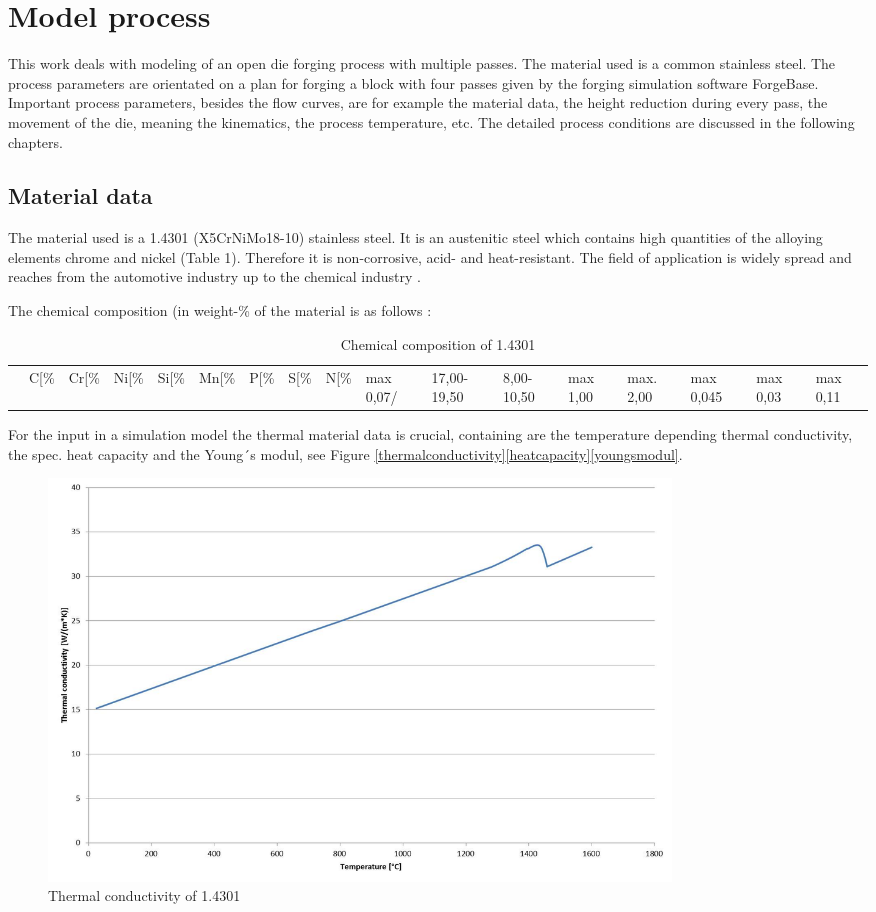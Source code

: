 \section{Model process}
This work deals with modeling of an open die forging process with multiple passes. The material used is a common stainless steel. The process parameters are orientated on a plan for forging a block with four passes given by the forging simulation software ForgeBase. Important process parameters, besides the flow curves, are for example the material data, the height reduction during every pass, the movement of the die, meaning the kinematics, the process temperature, etc. The detailed process conditions are discussed in the following chapters.\par

\subsection{Material data}
The material used is a 1.4301 (X5CrNiMo18-10) stainless steel. It is an austenitic steel which contains high quantities of the alloying elements chrome and nickel (Table 1). Therefore it is non-corrosive, acid- and heat-resistant. The field of application is widely spread and reaches from the automotive industry up to the chemical industry \cite{1.4301}.\par

The chemical composition (in weight-\%\) of the material is as follows \cite{metallograf.de}:\begin{table}
 \centering
 \caption{Chemical composition of 1.4301}
 \begin{tabular}{|c|c|c|c|c|c|}
 &C[\%\]&Cr[\%\]&Ni[\%\]&Si[\%\]&Mn[\%\]&P[\%\]&S[\%\]&N[\%\]
 \hline
 &max 0,07/&17,00-19,50&8,00-10,50&max 1,00&max. 2,00&max 0,045&max 0,03&max 0,11
 \end{tabular}
\end{table}\par

For the input in a simulation model the thermal material data is crucial, containing are the temperature depending thermal conductivity, the spec. heat capacity and the Young´s modul, see Figure \ref{thermalconductivity}\ref{heatcapacity}\ref{youngsmodul}.\par 

\begin{figure}[!htbp]
 \centering
 \includegraphics[width=0.8\textwidth]{images/thermalconductivity}
 \caption{Thermal conductivity of 1.4301}
 \label{img:thermalconductivity}
\end{figure}

